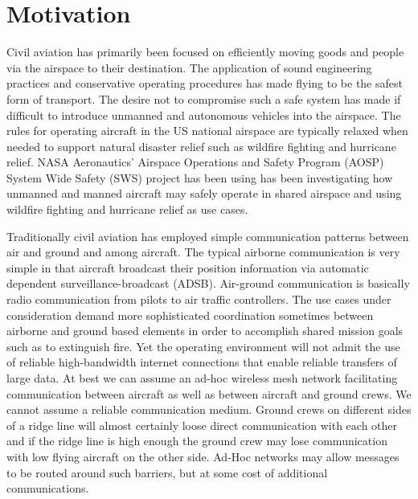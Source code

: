 \section{Motivation}

Civil aviation has primarily been focused on efficiently moving goods and people via the airspace to their destination. The application of sound engineering practices and conservative operating procedures has made flying to be  the safest form of transport. The desire not to compromise such a safe system has made if difficult to introduce unmanned and autonomous vehicles into the airspace. The rules for operating aircraft in the US national airspace are typically relaxed when needed to support natural disaster relief such as wildfire fighting and hurricane relief. NASA Aeronautics' Airspace Operations and Safety Program (AOSP) System Wide Safety (SWS) project has been using  has been investigating how unmanned and manned aircraft may safely operate in shared airspace and using wildfire fighting and hurricane relief as use cases.


 Traditionally  civil aviation has employed  simple communication patterns between air and ground and among aircraft. The typical airborne communication is very simple in that aircraft broadcast their position information via automatic dependent surveillance-broadcast (ADSB). Air-ground communication is basically radio communication from pilots to air traffic controllers.  The use cases under consideration demand more sophisticated coordination sometimes between airborne and ground based elements in order to accomplish shared mission goals such as to extinguish fire. Yet the operating environment will not admit the use of reliable high-bandwidth internet connections that enable reliable transfers of large data. At best we can assume an ad-hoc wireless mesh network facilitating communication  between aircraft as well as  between aircraft and ground crews.  We cannot assume a reliable communication medium. Ground crews on different sides of a ridge line will almost certainly loose direct communication with each other and if the ridge line is high enough the ground crew may lose communication with low flying aircraft on the other side. Ad-Hoc networks may allow messages to be routed around such barriers, but at some cost of additional communications. 
